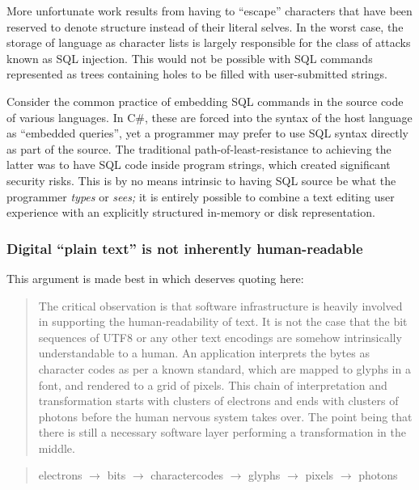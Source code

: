 \documentclass[ twoside,openright,titlepage,numbers=noenddot,headinclude,footinclude,cleardoublepage=empty,abstract=on,
                BCOR=5mm,paper=a4,fontsize=11pt
                ]{scrreprt}
\theoremstyle{definition}
\begin{document}
More unfortunate work results from having to ``escape'' characters that
have been reserved to denote structure instead of their literal selves.
In the worst case, the storage of language as character lists is largely
responsible for the class of attacks known as SQL injection. This would
not be possible with SQL commands represented as trees containing holes
to be filled with user-submitted strings.

Consider the common practice of embedding SQL commands in the source
code of various languages. In C\#, these are forced into the syntax of
the host language as ``embedded queries'', yet a programmer may prefer
to use SQL syntax directly as part of the source. The traditional
path-of-least-resistance to achieving the latter was to have SQL code
inside program strings, which created significant security risks. This
is by no means intrinsic to having SQL source be what the programmer
\emph{types} or \emph{sees;} it is entirely possible to combine a text
editing user experience with an explicitly structured in-memory or disk
representation.

\hypertarget{digital-plain-text-is-not-inherently-human-readable}{\subsubsection{Digital ``plain text'' is not inherently
human-readable}\label{digital-plain-text-is-not-inherently-human-readable}}

This argument is made best in \cite[p.\ 14]{Infra} which deserves
quoting here:

\begin{quote}
The critical observation is that software infrastructure is heavily
involved in supporting the human-readability of text. It is not the case
that the bit sequences of UTF8 or any other text encodings are somehow
intrinsically understandable to a human. An application interprets the
bytes as character codes as per a known standard, which are mapped to
glyphs in a font, and rendered to a grid of pixels. This chain of
interpretation and transformation starts with clusters of electrons and
ends with clusters of photons before the human nervous system takes
over. The point being that there is still a necessary software layer
performing a transformation in the middle.
\end{quote}

\begin{quote}
electrons \(\rightarrow\) bits \(\rightarrow\) charactercodes
\(\rightarrow\) glyphs \(\rightarrow\) pixels \(\rightarrow\) photons
\end{quote}
\end{document}
